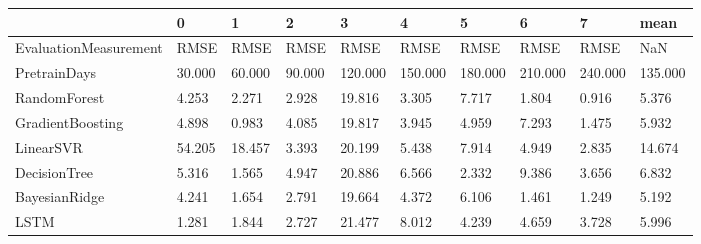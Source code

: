 \begin{tabular}{llllllllll}
\toprule
{} &      0 &      1 &      2 &       3 &       4 &       5 &       6 &       7 &    mean \\
\midrule
EvaluationMeasurement &   RMSE &   RMSE &   RMSE &    RMSE &    RMSE &    RMSE &    RMSE &    RMSE &     NaN \\
PretrainDays          & 30.000 & 60.000 & 90.000 & 120.000 & 150.000 & 180.000 & 210.000 & 240.000 & 135.000 \\
RandomForest          &  4.253 &  2.271 &  2.928 &  19.816 &   3.305 &   7.717 &   1.804 &   0.916 &   5.376 \\
GradientBoosting      &  4.898 &  0.983 &  4.085 &  19.817 &   3.945 &   4.959 &   7.293 &   1.475 &   5.932 \\
LinearSVR             & 54.205 & 18.457 &  3.393 &  20.199 &   5.438 &   7.914 &   4.949 &   2.835 &  14.674 \\
DecisionTree          &  5.316 &  1.565 &  4.947 &  20.886 &   6.566 &   2.332 &   9.386 &   3.656 &   6.832 \\
BayesianRidge         &  4.241 &  1.654 &  2.791 &  19.664 &   4.372 &   6.106 &   1.461 &   1.249 &   5.192 \\
LSTM                  &  1.281 &  1.844 &  2.727 &  21.477 &   8.012 &   4.239 &   4.659 &   3.728 &   5.996 \\
\bottomrule
\end{tabular}
